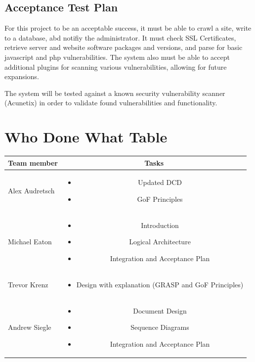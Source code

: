 \documentclass{article}
\begin{document}
\subsection{Acceptance Test Plan}
For this project to be an acceptable success, it must be able to crawl a site, write to a database, abd notifiy the administrator.  It must check SSL Certificates, retrieve server and website software packages and versions, and parse for basic javascript and php vulnerabilities.  The system also must be able to accept additional plugins for scanning various vulnerabilities, allowing for future expansions.

 The system will be tested against a known security vulnerability scanner (Acunetix) in order to validate found vulnerabilities and  functionality.
\newpage
\section{Who Done What Table}
\begin{center}
\begin{tabular}{|l|c|}
\hline
Team member & Tasks \\ \hline
Alex Audretsch & 
\begin{minipage}{.4\textwidth}
\vspace{11pt}
\begin{itemize}
	\item Updated DCD
	\item GoF Principles
\end{itemize} 
\end{minipage} \\ \hline
Michael Eaton & 
\begin{minipage}{.4\textwidth}
\vspace{11pt}
\begin{itemize}
	\item Introduction
	\item Logical Architecture
	\item Integration and Acceptance Plan
\end{itemize} 
\end{minipage} \\ \hline
Trevor Krenz & 
\begin{minipage}{.4\textwidth}
\vspace{11pt}
\begin{itemize}
	\item Design with explanation (GRASP and GoF Principles)
\end{itemize} 
\end{minipage} \\ \hline
Andrew Siegle & 
\begin{minipage}{.4\textwidth}
\vspace{11pt}
\begin{itemize}
	\item Document Design
	\item Sequence Diagrams
	\item Integration and Acceptance Plan
\end{itemize} 
\end{minipage} \\ \hline
\end{tabular}
\end{center}
\end{document}
